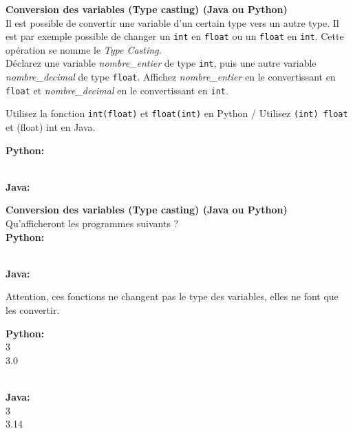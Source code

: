 \begin{Exercice}[5 minutes] \textbf{Conversion des variables (Type casting) (Java ou Python)}\\
   Il est possible de convertir une variable d'un certain type vers un autre type. Il est par exemple possible de changer un \lstinline{int} en \lstinline{float} ou un \lstinline{float} en \lstinline{int}. Cette opération se nomme le \textit{Type Casting}. \\
   Déclarez une variable \textit{nombre\_entier} de type \lstinline{int}, puis une autre variable \textit{nombre\_decimal} de type \lstinline{float}. Affichez \textit{nombre\_entier} en le convertissant en \lstinline{float} et \textit{nombre\_decimal} en le convertissant en \lstinline{int}. \\
   
    \begin{conseil}
       Utilisez la fonction \lstinline{int(float)} et \lstinline{float(int)} en Python / Utilisez \lstinline{(int) float} et (float) int en Java.
        
    \end{conseil}
    \begin{solution}
    
    \textbf{Python:}
    
    
    
    \textbf{\\Java:}
    
           
    \end{solution}   
\end{Exercice}
\begin{Exercice}[5 minutes] \textbf{Conversion des variables (Type casting) (Java ou Python) \optionnel}\\
   Qu'afficheront les programmes suivants ? \\
   
   \textbf{Python:}
   
   
   \textbf{\\Java:}
   
    
   
    \begin{conseil}
      	Attention, ces fonctions ne changent pas le type des variables, elles ne font que les convertir.
        
    \end{conseil}
    \begin{solution}
     
    \textbf{Python:}\\
    3\\
    3.0
    
    \textbf{\\Java:}\\
    3\\
    3.14 \\
           
    \end{solution}   
\end{Exercice}
